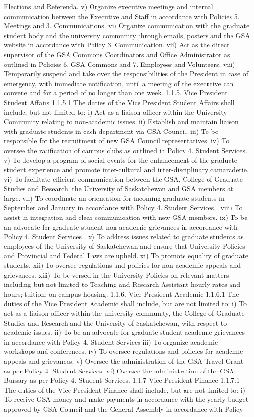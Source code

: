 Elections and Referenda. v) Organize executive meetings and internal communication between the Executive and Staff in accordance with Policies 5. Meetings and 3. Communications. vi) Organize communication with the graduate student body and the university community through emails, posters and the GSA website in accordance with Policy 3. Communication. vii) Act as the direct supervisor of the GSA Commons Coordinators and Office Administrator as outlined in Policies 6. GSA Commons and 7. Employees and Volunteers. viii) Temporarily suspend and take over the responsibilities of the President in case of emergency, with immediate notification, until a meeting of the executive can convene and for a period of no longer than one week. 1.1.5. Vice President Student Affairs 1.1.5.1 The duties of the Vice President Student Affairs shall include, but not limited to: i) Act as a liaison officer within the University Community relating to non-academic issues. ii) Establish and maintain liaison with graduate students in each department via GSA Council. iii) To be responsible for the recruitment of new GSA Council representatives. iv) To oversee the ratification of campus clubs as outlined in Policy 4. Student Services. v) To develop a program of social events for the enhancement of the graduate student experience and promote inter-cultural and inter-disciplinary camaraderie. vi) To facilitate efficient communication between the GSA, College of Graduate Studies and Research, the University of Saskatchewan and GSA members at large. vii) To coordinate an orientation for incoming graduate students in September and January in accordance with Policy 4. Student Services . viii) To assist in integration and clear communication with new GSA members. ix) To be an advocate for graduate student non-academic grievances in accordance with Policy 4. Student Services . x) To address issues related to graduate students as employees of the University of Saskatchewan and ensure that University Policies and Provincial and Federal Laws are upheld. xi) To promote equality of graduate students. xii) To oversee regulations and policies for non-academic appeals and grievances. xiii) To be versed in the University Policies on relevant matters including but not limited to Teaching and Research Assistant hourly rates and hours; tuition; on campus housing. 1.1.6. Vice President Academic 1.1.6.1 The duties of the Vice President Academic shall include, but are not limited to: i) To act as a liaison officer within the university community, the College of Graduate Studies and Research and the University of Saskatchewan, with respect to academic issues. ii) To be an advocate for graduate student academic grievances in accordance with Policy 4. Student Services iii) To organize academic workshops and conferences. iv) To oversee regulations and policies for academic appeals and grievances. v) Oversee the administration of the GSA Travel Grant as per Policy 4. Student Services. vi) Oversee the administration of the GSA Bursary as per Policy 4. Student Services. 1.1.7 Vice President Finance 1.1.7.1 The duties of the Vice President Finance shall include, but are not limited to: i) To receive GSA money and make payments in accordance with the yearly budget approved by GSA Council and the General Assembly in accordance with Policy 